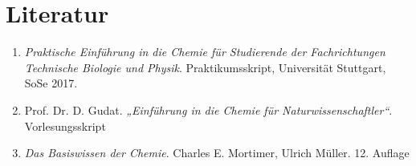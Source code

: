 \documentclass{scrartcl}
\begin{document}
\section{Literatur}
\begin{enumerate}[label=(\arabic*)]
	\item \emph{Praktische Einführung in die Chemie
für Studierende der Fachrichtungen
Technische Biologie und Physik}. Praktikumsskript, Universität Stuttgart,
SoSe 2017.  
	\item Prof. Dr. D. Gudat. \emph{„Einführung in die Chemie für Naturwissenschaftler“}. Vorlesungsskript
	\item \emph{Das Basiswissen der Chemie}. Charles E. Mortimer, Ulrich Müller. 12. Auflage
	\end{enumerate}
\end{document}
